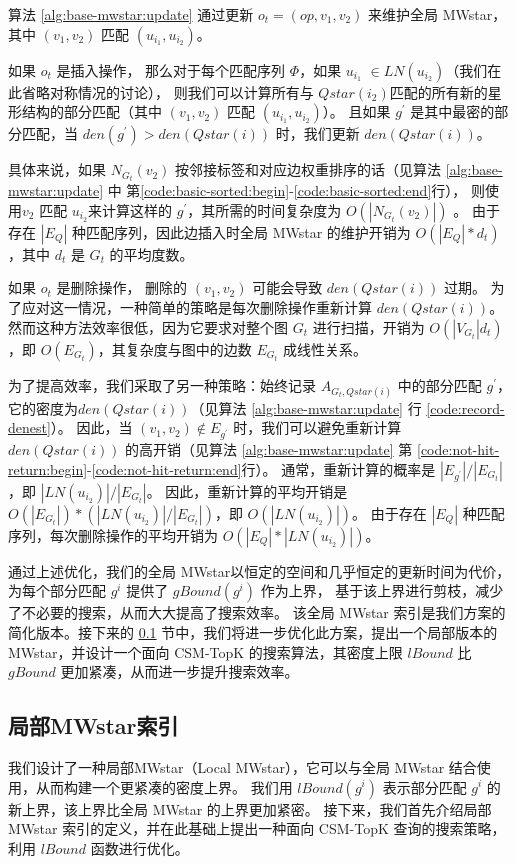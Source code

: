      算法 \ref{alg:base-mwstar:update} 通过更新 $o_t=(op, v_1, v_2)$ 来维护全局 MWstar，其中 $(v_1, v_2)$ 匹配 $(u_{i_1}, u_{i_2})$。
     
     如果 $o_t$ 是插入操作，
     那么对于每个匹配序列 $\Phi$，如果 $u_{i_1}$ $\in LN(u_{i_2})$（我们在此省略对称情况的讨论），
     则我们可以计算所有与 $Qstar(i_2)$匹配的所有新的星形结构的部分匹配（其中 $(v_1, v_2)$ 匹配 $(u_{i_1}, u_{i_2})$）。
     且如果 $g^\prime$ 是其中最密的部分匹配，当 $den(g^\prime) > den(Qstar(i))$ 时，我们更新 $den(Qstar(i))$。
     
     具体来说，如果 $N_{G_t}(v_2)$ 按邻接标签和对应边权重排序的话（见算法 \ref{alg:base-mwstar:update} 中 第\ref{code:basic-sorted:begin}-\ref{code:basic-sorted:end}行），
     则使用$v_2$ 匹配 $u_{i_2}$来计算这样的 $g^\prime$，其所需的时间复杂度为 $O(|N_{G_t}(v_2)|)$ 。
     由于存在 $|E_Q|$ 种匹配序列，因此边插入时全局 MWstar 的维护开销为 $O(|E_Q|*d_t)$，其中 $d_t$ 是 $G_t$ 的平均度数。
     
     如果 $o_t$ 是删除操作，
     删除的 $(v_1, v_2)$ 可能会导致 $den(Qstar(i))$ 过期。
     为了应对这一情况，一种简单的策略是每次删除操作重新计算 $den(Qstar(i))$。
     然而这种方法效率很低，因为它要求对整个图 $G_t$ 进行扫描，开销为 $O(|V_{G_t}|d_t)$，即 $O(E_{G_t})$，其复杂度与图中的边数 $E_{G_t}$ 成线性关系。
     
     为了提高效率，我们采取了另一种策略：始终记录 $A_{G_t, Qstar(i)}$ 中的部分匹配 $g^\prime$，它的密度为$den(Qstar(i))$（见算法 \ref{alg:base-mwstar:update} 行 \ref{code:record-denest}）。
     因此，当 $(v_1, v_2) \notin E_{g^\prime}$ 时，我们可以避免重新计算 $den(Qstar(i))$ 的高开销（见算法 \ref{alg:base-mwstar:update}  第 \ref{code:not-hit-return:begin}-\ref{code:not-hit-return:end}行）。
     通常，重新计算的概率是 $|E_{g^\prime}|/|E_{G_t}|$，即 $|LN(u_{i_2})|/|E_{G_t}|$。
     因此，重新计算的平均开销是 $O(|E_{G_t}|)*(|LN(u_{i_2})|/|E_{G_t}|)$，即 $O(|LN(u_{i_2})|)$。
     由于存在 $|E_Q|$ 种匹配序列，每次删除操作的平均开销为 $O(|E_Q|*|LN(u_{i_2})|)$。
     
     通过上述优化，我们的全局 MWstar以恒定的空间和几乎恒定的更新时间为代价，为每个部分匹配 $g^i$ 提供了 $gBound(g^i)$ 作为上界，
     基于该上界进行剪枝，减少了不必要的搜索，从而大大提高了搜索效率。
     该全局 MWstar 索引是我们方案的简化版本。接下来的 \ref{mwstar:local} 节中，我们将进一步优化此方案，提出一个局部版本的 MWstar，并设计一个面向 CSM-TopK 的搜索算法，其密度上限 $lBound$ 比 $gBound$ 更加紧凑，从而进一步提升搜索效率。

\subsection{局部MWstar索引}
\label{mwstar:local}
我们设计了一种局部MWstar（Local MWstar），它可以与全局 MWstar 结合使用，从而构建一个更紧凑的密度上界。
我们用 $lBound(g^i)$ 表示部分匹配 $g^i$ 的新上界，该上界比全局 MWstar 的上界更加紧密。
接下来，我们首先介绍局部 MWstar 索引的定义，并在此基础上提出一种面向 CSM-TopK 查询的搜索策略，利用 $lBound$ 函数进行优化。



